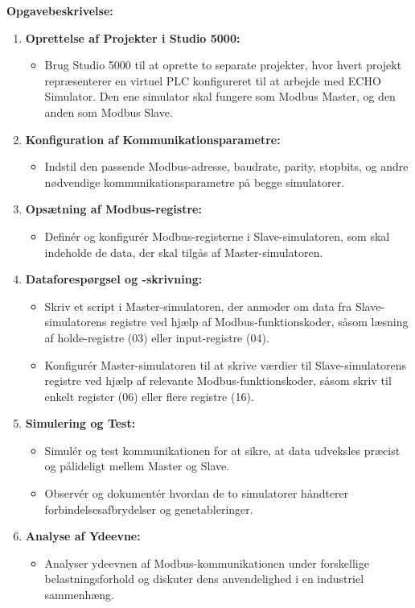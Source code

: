 \textbf{Opgavebeskrivelse:}
\begin{enumerate}
	\item \textbf{Oprettelse af Projekter i Studio 5000:}
	\begin{itemize}
		\item Brug Studio 5000 til at oprette to separate projekter, hvor hvert projekt repræsenterer en virtuel PLC konfigureret til at arbejde med ECHO Simulator. Den ene simulator skal fungere som Modbus Master, og den anden som Modbus Slave.
	\end{itemize}
	\item \textbf{Konfiguration af Kommunikationsparametre:}
	\begin{itemize}
		\item Indstil den passende Modbus-adresse, baudrate, parity, stopbits, og andre nødvendige kommunikationsparametre på begge simulatorer.
	\end{itemize}
	\item \textbf{Opsætning af Modbus-registre:}
	\begin{itemize}
		\item Definér og konfigurér Modbus-registerne i Slave-simulatoren, som skal indeholde de data, der skal tilgås af Master-simulatoren.
	\end{itemize}
	\item \textbf{Dataforespørgsel og -skrivning:}
	\begin{itemize}
		\item Skriv et script i Master-simulatoren, der anmoder om data fra Slave-simulatorens registre ved hjælp af Modbus-funktionskoder, såsom læsning af holde-registre (03) eller input-registre (04).
		\item Konfigurér Master-simulatoren til at skrive værdier til Slave-simulatorens registre ved hjælp af relevante Modbus-funktionskoder, såsom skriv til enkelt register (06) eller flere registre (16).
	\end{itemize}
	\item \textbf{Simulering og Test:}
	\begin{itemize}
		\item Simulér og test kommunikationen for at sikre, at data udveksles præcist og pålideligt mellem Master og Slave.
		\item Observér og dokumentér hvordan de to simulatorer håndterer forbindelsesafbrydelser og genetableringer.
	\end{itemize}
	\item \textbf{Analyse af Ydeevne:}
	\begin{itemize}
		\item Analyser ydeevnen af Modbus-kommunikationen under forskellige belastningsforhold og diskuter dens anvendelighed i en industriel sammenhæng.
	\end{itemize}
\end{enumerate}

